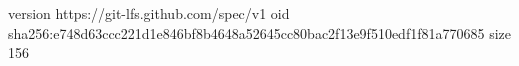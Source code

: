 version https://git-lfs.github.com/spec/v1
oid sha256:e748d63ccc221d1e846bf8b4648a52645cc80bac2f13e9f510edf1f81a770685
size 156
